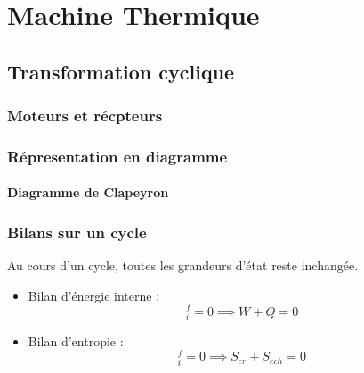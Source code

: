 \chapter{Machine Thermique} %
\label{chap:Machine Thermique}

\section{Transformation cyclique} %
\label{sec:Transformation cyclique}

\subsection{Moteurs et récpteurs} %
\label{sub:Moteurs et récpteurs}


\subsection{Répresentation en diagramme} %
\label{sub:Répresentation en diagramme}

\subsubsection{Diagramme de Clapeyron} %
\label{sec:Diagramme de Clapeyron}


\subsection{Bilans sur un cycle} %
\label{sub:Bilans sur un cycle}

Au cours d'un cycle, toutes les grandeurs d'état reste inchangée.

\begin{itemize}

    \item Bilan d'énergie interne : 
      \begin{equation}
        [U] _i ^{f} = 0 \implies W + Q = 0
      \end{equation}

    \item Bilan d'entropie : 
      \begin{equation}
        [S] _ i ^{f} = 0 \implies S _{cr} + S _{ech} = 0
      \end{equation}
\end{itemize}

